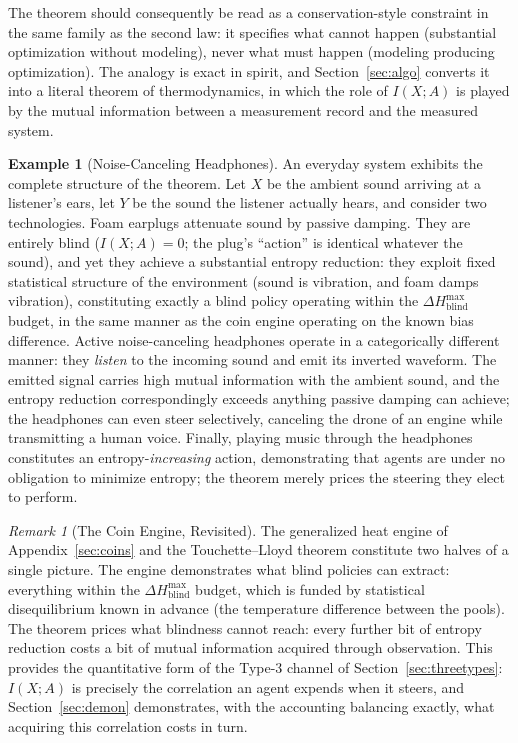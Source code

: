 \documentclass[10pt]{article}
\theoremstyle{definition}
\newtheorem{example}[theorem]{Example}
\theoremstyle{remark}
\newtheorem{remark}[theorem]{Remark}
\begin{document}
The theorem should consequently be read as a conservation-style constraint in the same family as the second law: it specifies what cannot happen (substantial optimization without modeling), never what must happen (modeling producing optimization). The analogy is exact in spirit, and Section~\ref{sec:algo} converts it into a literal theorem of thermodynamics, in which the role of $I(X;A)$ is played by the mutual information between a measurement record and the measured system.

\begin{example}[Noise-Canceling Headphones]
\label{ex:headphones}
An everyday system exhibits the complete structure of the theorem. Let $X$ be the ambient sound arriving at a listener's ears, let $Y$ be the sound the listener actually hears, and consider two technologies. Foam earplugs attenuate sound by passive damping. They are entirely blind ($I(X;A) = 0$; the plug's ``action'' is identical whatever the sound), and yet they achieve a substantial entropy reduction: they exploit fixed statistical structure of the environment (sound is vibration, and foam damps vibration), constituting exactly a blind policy operating within the $\Delta H^{\max}_{\text{blind}}$ budget, in the same manner as the coin engine operating on the known bias difference. Active noise-canceling headphones operate in a categorically different manner: they \emph{listen} to the incoming sound and emit its inverted waveform. The emitted signal carries high mutual information with the ambient sound, and the entropy reduction correspondingly exceeds anything passive damping can achieve; the headphones can even steer selectively, canceling the drone of an engine while transmitting a human voice. Finally, playing music through the headphones constitutes an entropy-\emph{increasing} action, demonstrating that agents are under no obligation to minimize entropy; the theorem merely prices the steering they elect to perform.
\end{example}

\begin{remark}[The Coin Engine, Revisited]
The generalized heat engine of Appendix~\ref{sec:coins} and the Touchette--Lloyd theorem constitute two halves of a single picture. The engine demonstrates what blind policies can extract: everything within the $\Delta H^{\max}_{\text{blind}}$ budget, which is funded by statistical disequilibrium known in advance (the temperature difference between the pools). The theorem prices what blindness cannot reach: every further bit of entropy reduction costs a bit of mutual information acquired through observation. This provides the quantitative form of the Type-3 channel of Section~\ref{sec:threetypes}: $I(X;A)$ is precisely the correlation an agent expends when it steers, and Section~\ref{sec:demon} demonstrates, with the accounting balancing exactly, what acquiring this correlation costs in turn.
\end{remark}
\end{document}
